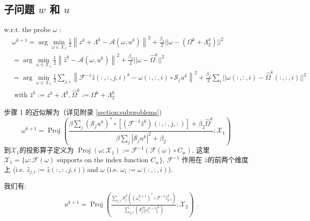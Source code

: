 \documentclass[12pt]{article}
\begin{document}
\subsection{子问题 $w$ 和 $u$}
w.r.t. the probe $\omega$ :
$$
\begin{aligned}
&\omega^{k+1}=\arg \min _{\omega \in \mathcal{X}_{1}} \frac{1}{2}\left\|z^{k} + \Lambda^k -\mathcal{A}\left(\omega, u^{k}\right)\right\|^{2} + \frac{\beta_{2}}{2}||\omega - (\Omega^k + \Lambda_2^k)||^2\\
&=\arg \min _{\omega \in \mathcal{X}_{1}} \frac{1}{2}\left\|\hat{z}^{k}-\mathcal{A}\left(\omega, u^{k}\right)\right\|^{2}
+ \frac{\beta_{2}}{2}||\omega - \hat{\Omega}^k||^2\\
&=\arg \min _{\omega \in \mathcal{X}_{1}} \frac{1}{2} \sum_{j,i}\left\|\mathcal{F}^{-1} \hat{z}(:,:,j,i)^{k}-\omega(:,:,i) \circ \mathcal{S}_{j} u^{k}\right\|^{2}
+ \frac{\beta_2}{2} \sum_i ||\omega(:,:,i) - \hat{\Omega}^k(:,:,i)||^2\\
& \text { with } \hat{z}^{k}:=z^{k}+\Lambda^{k}, \hat{\Omega}^k := \Omega^k + \Lambda_2^k
\end{aligned}
$$

步骤 1 的近似解为（详见附录 \ref{section:subproblems})
\begin{equation}
\omega^{k+1}=\operatorname{Proj}\left(\frac{ \beta\sum_{j}\left(\mathcal{S}_{j} u^{k}\right)^{*} \circ [ \left(\mathcal{F}^{-1} \hat{z}^k\right)(:,:,j,:) ]
	+ \beta_2 \hat{\Omega}^k}{ \beta \sum_{j}\left|\mathcal{S}_{j} u^{k}\right|^{2}+\beta_2} ; \mathcal{X}_{1}\right)
\label{omegaup}
\end{equation}
 到$\mathcal{X}_{1}$的投影算子定义为 $\operatorname{Proj}\left(\omega ;\mathcal{X}_{1}\right):= \mathcal{F}^{-1}( \mathcal{F}(\omega) \circ C_w)$, 这里 $\mathcal{X}_{1}=\{\omega : \mathcal{F}(\omega) \mbox{ supports on the index function } C_w \}$. $\mathcal{F}^{-1}$ 作用在 $\hat{z}$的前两个维度上 (i.e. $\hat{z}_{j,i} :=\hat{z}(:,:,j,i)$) and $\omega$ (i.e. $\omega_i := \omega(:,:,i)$).

我们有:
\begin{equation}
\begin{aligned}
&\quad u^{k+1}=\operatorname{Proj}\left(\frac{\sum_{j,i} \mathcal{S}_{j}^{T}\left(\left(\omega_i^{k+1}\right)^{*} \circ \mathcal{F}^{-1} \hat{z}_{j,i}^{k}\right)}{\sum_{j,i}\left(\mathcal{S}_{j}^{T}\left|\omega_i^{k+1}\right|^{2}\right)} ; \mathcal{X}_{2}\right) \text { . }
\end{aligned}
\label{uup}
\end{equation}
\end{document}

